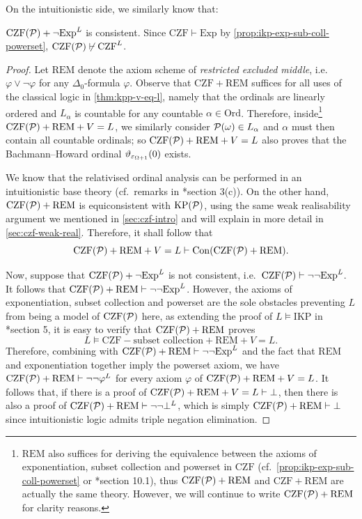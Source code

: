 \documentclass[12pt,openany]{book}
\makeatletter
\newcommand\inds[1]{\index{C@Set theory!#1}}
\theoremstyle{plain}
\theoremstyle{definition}
\DeclareMathOperator\Con{Con}
\newcommand\Pow{\mathcal{P}}
\newcommand\KPP{\mathrm{KP}\mleft(\Pow\mright)}
\newcommand\CZF{\mathrm{CZF}}
\newcommand\CZFP{\mathrm{CZF}\mleft(\Pow\mright)}
\newcommand\Exp{\mathrm{Exp}}
\newcommand\REM{\mathrm{REM}}
\newcommand\IKP{\mathrm{IKP}}
\newcommand\Ord{\mathrm{Ord}}
\makeatother
\begin{document}
On the intuitionistic side, we similarly know that:
\begin{proposition}
  \label{prop:czf-l-not-exp-con}
  $\CZFP + \neg \Exp^L$ is consistent. Since $\CZF \vdash \Exp$ by \autoref{prop:ikp-exp-sub-coll-powerset}, $\CZFP \not\vdash \CZF^L$.
\end{proposition}

\begin{proof}
  Let $\REM$ denote the axiom scheme of \emph{restricted excluded middle}\inds{restricted excluded middle, $\REM$}, i.e.\ $\varphi \lor \neg \varphi$ for any $\Delta_0$-formula $\varphi$. Observe that $\CZF + \REM$ suffices for all uses of the classical logic in \autoref{thm:kpp-v-eq-l}, namely that the ordinals are linearly ordered and $L_\alpha$ is countable for any countable $\alpha \in \Ord$. Therefore, inside\footnote{$\REM$ also suffices for deriving the equivalence between the axioms of exponentiation, subset collection and powerset in $\CZF$ (cf.\ \autoref{prop:ikp-exp-sub-coll-powerset} or \cite{aczel-rathjen10-cst-book}*{section 10.1}), thus $\CZFP + \REM$ and $\CZF + \REM$ are actually the same theory. However, we will continue to write $\CZFP + \REM$ for clarity reasons.} $\CZFP + \REM + V = L$, we similarly consider $\Pow\mleft(\omega\mright) \in L_\alpha$ and $\alpha$ must then contain all countable ordinals; so $\CZFP + \REM + V = L$ also proves that the Bachmann--Howard ordinal $\vartheta_{\varepsilon_{\Omega + 1}}\mleft(0\mright)$ exists.

  We know that the relativised ordinal analysis can be performed in an intuitionistic base theory (cf.\ remarks in \cite{rathjen23-ep-intuitionistic-set-theory}*{section 3(c)}). On the other hand, $\CZFP + \REM$ is equiconsistent with $\KPP$, using the same weak realisability argument we mentioned in \autoref{sec:czf-intro} and will explain in more detail in \autoref{sec:czf-weak-real}. Therefore, it shall follow that
  \[\CZFP + \REM + V = L \vdash \Con\mleft(\CZFP + \REM\mright).\]

  Now, suppose that $\CZFP + \neg \Exp^L$ is not consistent, i.e.\ $\CZFP \vdash \neg \neg \Exp^L$. It follows that $\CZFP + \REM \vdash \neg \neg \Exp^L$. However, the axioms of exponentiation, subset collection and powerset are the sole obstacles preventing $L$ from being a model of $\CZFP$ here, as extending the proof of $L \vDash \IKP$ in \cite{matthews-rathjen24-constructible-universe}*{section 5}, it is easy to verify that $\CZFP + \REM$ proves
  \[L \vDash \CZF - \text{subset collection} + \REM + V = L.\]
  Therefore, combining with $\CZFP + \REM \vdash \neg \neg \Exp^L$ and the fact that $\REM$ and exponentiation together imply the powerset axiom, we have $\CZFP + \REM \vdash \neg \neg \varphi^L$ for every axiom $\varphi$ of $\CZFP + \REM + V = L$. It follows that, if there is a proof of $\CZFP + \REM + V = L \vdash \bot$, then there is also a proof of $\CZFP + \REM \vdash \neg \neg \bot^L$, which is simply $\CZFP + \REM \vdash \bot$ since intuitionistic logic admits triple negation elimination.


\end{proof}
\end{document}
